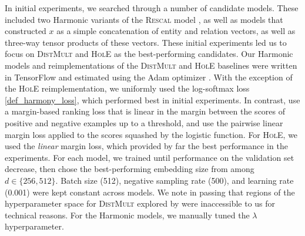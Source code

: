 \documentclass[a4paper,10pt]{article}
\begin{document}
In initial experiments, we searched through a number of candidate models. These included two Harmonic variants of the \textsc{Rescal} model \citep{nickel2011rescal}, as well as models that constructed $x$ as a simple concatenation of entity and relation vectors, as well as three-way tensor products of these vectors. These initial experiments led us to focus on \textsc{DistMult} and \textsc{HolE} as the best-performing candidates. 
Our Harmonic models and reimplementations of the \textsc{DistMult} and \textsc{HolE} baselines were written in TensorFlow \citep{tensorflow} and estimated using the Adam optimizer \citep{adamoptimizer}. With the exception of the \textsc{HolE} reimplementation, we uniformly used the log-softmax loss \ref{def_harmony_loss}, which performed best in initial experiments. In contrast, \citet{yang2015distmult} use a margin-based ranking loss that is linear in the margin between the scores of positive and negative examples up to a threshold, and \citet{nickel2016hole} use the pairwise linear margin loss applied to the scores squashed by the logistic function. For \textsc{HolE}, we used the \emph{linear} margin loss, which provided by far the best performance in the experiments. For each model, we trained until performance on the validation set decrease, then chose the best-performing embedding size from among $d\in \{256,512\}$. Batch size (512), negative sampling rate (500), and learning rate (0.001) were kept constant across models. We note in passing that regions of the hyperparameter space for \textsc{DistMult} explored by \citet{kaldec2017baselines} were inaccessible to us for technical reasons. For the Harmonic models, we manually tuned the $\lambda$ hyperparameter.
\end{document}
